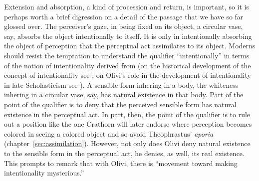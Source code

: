 Extension and absorption, a kind of procession and return, is important, so it is perhaps worth a brief digression on a detail of the passage that we have so far glossed over. The perceiver's gaze, in being fixed on its object, a circular vase, say, absorbs the object intentionally to itself. It is only in intentionally absorbing the object of perception that the perceptual act assimilates to its object. Moderns should resist the temptation to understand the qualifier ``intentionally'' in terms of the notion of intentionality derived from \citet{Brentano:1874aa} (on the historical development of the concept of intentionality see \citealt{Sorabji:2003fk}; on Olivi's role in the development of intentionality in late Scholasticism see \citealt[chapter 2]{Pasnau:1997aa}). A sensible form inhering in a body, the whiteness inhering in a circular vase, say, has natural existence in that body. Part of the point of the qualifier is to deny that the perceived sensible form has natural existence in the perceptual act. In part, then, the point of the qualifier is to rule out a position like the one Crathorn will later endorse where perception becomes colored in seeing a colored object and so avoid Theophrastus' \emph{aporia} (chapter~\ref{sec:assimilation}). However, not only does Olivi deny natural existence to the sensible form in the perceptual act, he denies, as well, its real existence. This prompts \citet[67]{Pasnau:1997aa} to remark that with Olivi, there is ``movement toward making intentionality mysterious.''


